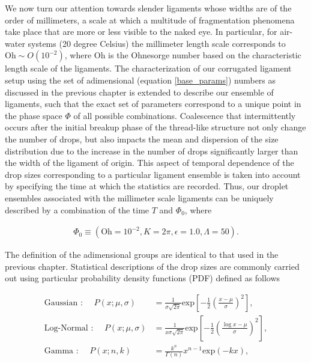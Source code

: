 We now turn our attention towards slender ligaments whose widths are of the 
order of millimeters, a scale at which a multitude of fragmentation phenomena
take place that are more or less visible to the naked eye.
In particular, for air-water systems (20 degree Celsius) the millimeter length 
scale corresponds to $\textrm{Oh} \sim O(10^{-2})$, where $\textrm{Oh}$ is the Ohnesorge number
based on the characteristic length scale of the ligaments. 
The characterization of our corrugated ligament setup using the set of adimensional
(equation \eqref{base_params}) numbers as discussed in the previous chapter is extended 
to describe our ensemble of ligaments, such that the exact set of parameters
correspond to a unique point in the phase space $\Phi$ of all possible combinations. 
Coalescence that intermittently occurs after the initial breakup phase of 
the thread-like structure not only change the number of drops, but also impacts the 
mean and dispersion of the size distribution due to the increase in the number of drops
significantly larger than the width of the ligament of origin.   
This aspect of temporal dependence of the drop sizes corresponding to a particular ligament ensemble
is taken into account by specifying the time at which the statistics are recorded. 
Thus, our droplet ensembles associated with the millimeter scale ligaments can be uniquely described 
by a combination of the time $T$ and $\Phi_0$, where

\begin{align}
	\Phi_0 \equiv \left( \textrm{Oh}=10^{-2}, K=2\pi, \epsilon=1.0, \Lambda=50 \right). 
\end{align}

The definition of the adimensional groups are identical to that used in the previous chapter.
Statistical descriptions of the drop sizes are commonly carried out using
particular probability density functions (PDF) defined as follows 



\begin{align}
	\text{Gaussian : } \quad P\left( x ; \mu , \sigma \right) &= 
	\frac{1}{\sigma \sqrt{2\pi}} \textrm{exp}\left[-\frac{1}{2}\left(\frac{x - \mu}{\sigma}\right)^2\right] \label{gauss},\\
	\text{Log-Normal : } \quad P\left( x ; \mu , \sigma \right) &= 
	\frac{1}{x \sigma \sqrt{2\pi}} \textrm{exp}\left[-\frac{1}{2}\left(\frac{\log x - \mu}{\sigma}\right)^2\right] \label{log_normal},\\
	\text{Gamma : } \quad P\left( x ; n,k \right) &= 
	\frac{k^{n}}{\Gamma(n)} x^{n-1} \textrm{exp}\left(-k x\right) \label{gamma}, 
\end{align}

